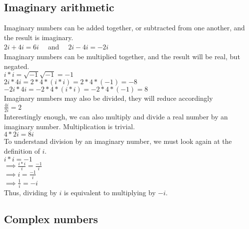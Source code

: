 \subsection{Imaginary arithmetic}

Imaginary numbers can be added together, or subtracted from one another, and the result is imaginary.\\

\tab$2i + 4i = 6i$ \ \ and \ \ $2i - 4i = -2i$\\ 

Imaginary numbers can be multiplied together, and the result will be real, but negated.\\

\tab$ i * i = \sqrt{-1}\sqrt{-1} = -1 $\\

\tab$2i * 4i = 2*4*(i*i) = 2*4*(-1) = -8$\\

\tab$-2i * 4i = -2*4*(i*i) = -2*4*(-1) = 8$\\

Imaginary numbers may also be divided, they will reduce accordingly\\

\tab$\frac{4i}{2i} = 2$\\

Interestingly enough, we can also multiply and divide a real number by an imaginary number.  Multiplication is trivial.\\

\tab$4*2i = 8i$\\

To understand division by an imaginary number, we must look again at the definition of $i$.\\

\tab$i*i = -1$\\

\tab$\implies \frac{i*i}{i} = \frac{-1}{i}$\\

\tab$\implies i = \frac{-1}{i}$\\

\tab$ \implies \frac{1}{i} = -i$\\

Thus, dividing by $i$ is equivalent to multiplying by $-i$.\\

\subsection{Complex numbers}


